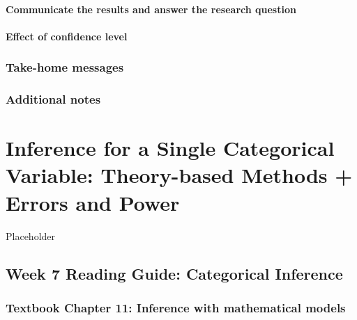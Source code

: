 \documentclass[
]{report}
\begin{document}
\hypertarget{communicate-the-results-and-answer-the-research-question-1}{%
\subsubsection*{Communicate the results and answer the research question}\label{communicate-the-results-and-answer-the-research-question-1}}

\hypertarget{effect-of-confidence-level}{%
\subsubsection*{Effect of confidence level}\label{effect-of-confidence-level}}

\hypertarget{take-home-messages-10}{%
\subsection{Take-home messages}\label{take-home-messages-10}}

\hypertarget{additional-notes-9}{%
\subsection{Additional notes}\label{additional-notes-9}}

\hypertarget{inference-for-a-single-categorical-variable-theory-based-methods-errors-and-power}{%
\chapter{Inference for a Single Categorical Variable: Theory-based Methods + Errors and Power}\label{inference-for-a-single-categorical-variable-theory-based-methods-errors-and-power}}

Placeholder

\hypertarget{week-7-reading-guide-categorical-inference}{%
\section{Week 7 Reading Guide: Categorical Inference}\label{week-7-reading-guide-categorical-inference}}

\hypertarget{textbook-chapter-11-inference-with-mathematical-models}{%
\subsection*{Textbook Chapter 11: Inference with mathematical models}\label{textbook-chapter-11-inference-with-mathematical-models}}
\end{document}
